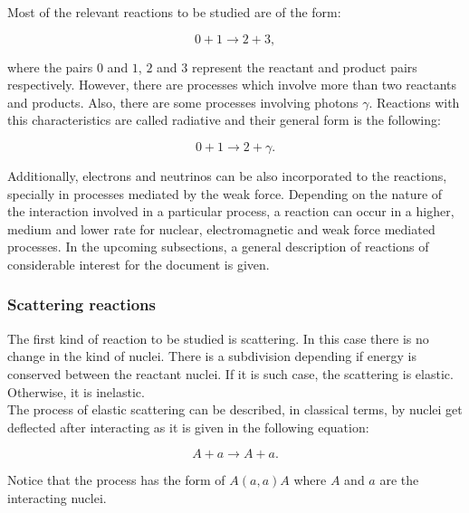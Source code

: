 \documentclass[openany]{book}
\begin{document}
Most of the relevant reactions to be studied are of the form: 

\begin{equation} \label{eq:nuclearReaction_general}
	0 + 1 \rightarrow 2 + 3,
\end{equation}

where the pairs $0$ and $1$, $2$ and $3$ represent the reactant and product pairs respectively. However, there are processes which involve more than two reactants and products. Also, there are some processes involving photons $\gamma$. Reactions with this characteristics are called radiative and their general form is the following:

\begin{equation} \label{eq:nuclearReaction_gammaCapture}
		0 + 1 \rightarrow 2 + \gamma.
\end{equation}

Additionally, electrons and neutrinos can be also incorporated to the reactions, specially in processes mediated by the weak force. Depending on the nature of the interaction involved in a particular process, a reaction can occur in a higher, medium and lower rate for nuclear, electromagnetic and weak force mediated processes. In the upcoming subsections, a general description of reactions of considerable interest for the document is given.  

\subsubsection{Scattering reactions} \label{ssub:scatteringReactions}

The first kind of reaction to be studied is scattering. In this case there is no change in the kind of nuclei. There is a subdivision depending if energy is conserved between the reactant nuclei. If it is such case, the scattering is elastic. Otherwise, it is inelastic. \\

The process of elastic scattering can be described, in classical terms, by nuclei get deflected after interacting as it is given in the following equation:

\begin{equation}  \label{eq:nuclearReaction_scattering_elastic}
	A + a \rightarrow A + a.
\end{equation}

Notice that the process has the form of $A(a, a)A$ where $A$ and $a$ are the interacting nuclei. \\
\end{document}
